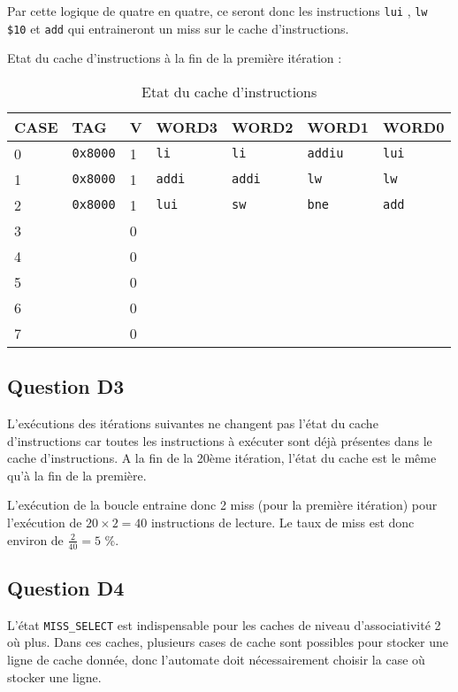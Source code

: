 \documentclass{article}
\begin{document}
Par cette logique de quatre en quatre, ce seront donc les instructions
\texttt{lui} , \texttt{lw \$10} et \texttt{add}  qui entraineront un miss sur le cache d'instructions.

Etat du cache d'instructions à la fin de la première itération :
\begin{table}[H]
\centering
\begingroup
\setlength{\tabcolsep}{5pt}
\renewcommand{\arraystretch}{1.1}
\begin{tabular}{| l | l | l | l | l | l | l |}

\hline
CASE & TAG & V & WORD3 & WORD2 & WORD1 & WORD0 \\
\hline
0 &\texttt{0x8000} & 1 & \texttt{li} & \texttt{li} & \texttt{addiu} & \texttt{lui} \\
\hline
1 &\texttt{0x8000} & 1 & \texttt{addi} & \texttt{addi} & \texttt{lw} & \texttt{lw} \\
\hline
2 & \texttt{0x8000} & 1 & \texttt{lui} & \texttt{sw} & \texttt{bne} & \texttt{add} \\
\hline
3&&0&&&&\\
\hline
4&&0&&&&\\
\hline
5&&0&&&&\\
\hline
6&&0&&&&\\
\hline
7&&0&&&&\\
\hline

\end{tabular}
\caption{Etat du cache d'instructions}
\endgroup
\end{table}


\subsection{Question D3}

L'exécutions des itérations suivantes ne changent pas l'état du cache
d'instructions car toutes les instructions à exécuter sont déjà présentes
dans le cache d'instructions.
A la fin de la 20ème itération, l'état du cache est le même qu'à la fin
de la première.

L'exécution de la boucle entraine donc 2 miss (pour la première itération)
pour l'exécution de $20 \times 2 = 40$ instructions de lecture. Le taux de miss est donc
environ de $\frac{2}{40} = 5$ \%.

\subsection{Question D4}

L'état \texttt{MISS\_SELECT}  est indispensable pour les caches de niveau d'associativité
2 où plus. Dans ces caches, plusieurs cases de cache sont possibles pour
stocker une ligne de cache donnée, donc l'automate doit nécessairement choisir
la case où stocker une ligne.
\end{document}
